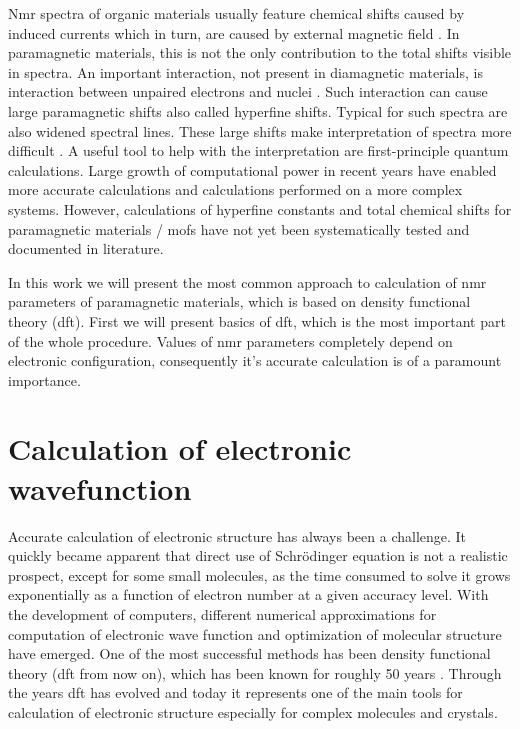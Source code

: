 \documentclass[openany, longbibliography,slovene,a4paper,12pt]{article}
\begin{document}
 Nmr spectra of organic materials usually feature chemical shifts caused by
 induced currents which in turn, are caused by external magnetic field
 \cite{chemic_shift_tensor_review}. In paramagnetic materials, this is not the
 only contribution to the total shifts visible in spectra. An important
 interaction, not present in  diamagnetic materials, is interaction between
 unpaired electrons and nuclei
 \cite{Dft_Investigation_of_the_Effect_of_Spin_Orbit}.
 Such interaction can cause large paramagnetic
 shifts also called hyperfine shifts. Typical for such spectra are also widened
 spectral lines. These large shifts make interpretation of spectra more difficult
 \cite{Dft_Investigation_of_the_Effect_of_Spin_Orbit}. A useful tool to help
 with the interpretation are first-principle quantum calculations. Large growth
 of computational power in recent years have enabled more accurate calculations
 and calculations performed on a more complex systems. However, calculations of
 hyperfine constants and total chemical shifts for paramagnetic materials / mofs
 have not yet been systematically tested and documented in literature.

 In this work we will present the most common approach to calculation of nmr
 parameters of paramagnetic materials,  which is based on density functional
 theory (dft). First we  will present basics of dft, which is the most important part of the whole procedure. Values of nmr parameters completely depend on electronic configuration, consequently it's accurate calculation is of a paramount importance. 

\section{Calculation of electronic wavefunction}
Accurate calculation of electronic structure has always been a challenge. It
quickly became apparent that direct use of Schr{\"o}dinger equation is not a
realistic prospect, except for some small
molecules, as the time consumed to solve it grows exponentially
\cite{nobel_lecture} as a function of electron
number at a given accuracy level. With the development of computers, different
numerical approximations for computation of electronic wave function and
optimization of molecular structure have emerged. One of the most successful methods has been density functional theory
(dft from now on), which has been known for roughly 50 years \cite{nobel_lecture}. Through the years dft has evolved and today it represents one of the main tools for calculation of electronic structure especially for complex molecules and crystals.
\end{document}
